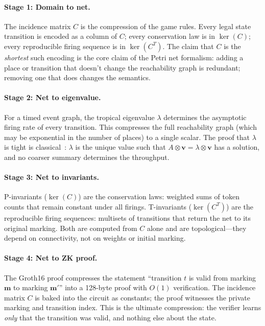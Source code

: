 \documentclass[11pt,a4paper]{article}
\begin{document}
\paragraph{Stage 1: Domain to net.}
The incidence matrix $C$ is the compression of the game rules.
Every legal state transition is encoded as a column of $C$; every conservation law is in $\ker(C)$; every reproducible firing sequence is in $\ker(C^T)$.
The claim that $C$ is the \emph{shortest} such encoding is the core claim of the Petri net formalism: adding a place or transition that doesn't change the reachability graph is redundant; removing one that does changes the semantics.

\paragraph{Stage 2: Net to eigenvalue.}
For a timed event graph, the tropical eigenvalue $\lambda$ determines the asymptotic firing rate of every transition.
This compresses the full reachability graph (which may be exponential in the number of places) to a single scalar.
The proof that $\lambda$ is tight is classical~\cite{baccelli1992}: $\lambda$ is the unique value such that $A \otimes \mathbf{v} = \lambda \otimes \mathbf{v}$ has a solution, and no coarser summary determines the throughput.

\paragraph{Stage 3: Net to invariants.}
P-invariants ($\ker(C)$) are the conservation laws: weighted sums of token counts that remain constant under all firings.
T-invariants ($\ker(C^T)$) are the reproducible firing sequences: multisets of transitions that return the net to its original marking.
Both are computed from $C$ alone and are topological---they depend on connectivity, not on weights or initial marking.

\paragraph{Stage 4: Net to ZK proof.}
The Groth16 proof compresses the statement ``transition $t$ is valid from marking $\mathbf{m}$ to marking $\mathbf{m}'$'' into a 128-byte proof with $O(1)$ verification.
The incidence matrix $C$ is baked into the circuit as constants; the proof witnesses the private marking and transition index.
This is the ultimate compression: the verifier learns \emph{only} that the transition was valid, and nothing else about the state.
\end{document}
